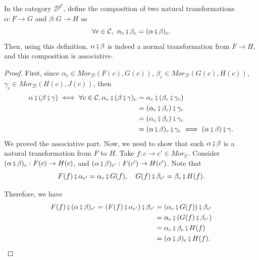 \begin{proposition}
  In the category $\mathcal D^{\mathcal C}$, define the composition of two natural
  transformations $\alpha:F\to G$ and $\beta:G\to H$ as
  \begin{displaymath}
    \forall c \in \mathcal C, \ \alpha_c \fatsemi \beta_c = (\alpha \fatsemi \beta)_c.
  \end{displaymath}
  Then, using this definition, $\alpha \fatsemi \beta$ is indeed a normal transformation
  from $F \to H$, and this composition is associative.
\end{proposition}
\begin{proof}
  First, since
  $\alpha_c \in Mor_\mathcal D (F(c),G(c))$,
  $\beta_c \in Mor_\mathcal D (G(c),H(c))$,
  $\gamma_c \in Mor_\mathcal D (H(c),J(c))$,
  then
  \begin{align*}
    \alpha \fatsemi (\beta \fatsemi \gamma) \iff 
    \forall c \in \mathcal C, \alpha_c \fatsemi (\beta \fatsemi \gamma)_c &=
    \alpha_c \fatsemi (\beta_c \fatsemi \gamma_c)\\&=
    (\alpha_c \fatsemi \beta_c) \fatsemi \gamma_c \\&= 
    (\alpha_c \fatsemi \beta_c) \fatsemi \gamma_c \\&= 
    (\alpha \fatsemi \beta)_c \fatsemi \gamma_c
    \iff (\alpha \fatsemi \beta) \fatsemi \gamma.
  \end{align*}
  We proved the associative part. Now, we need to show that such $\alpha \fatsemi \beta$
  is a natural transformation from $F$ to $H$. Take $f:c\to c' \in Mor_\mathcal C$.
  Consider $(\alpha \fatsemi \beta)_{c}:F(c) \to H(c)$, and
  $(\alpha\fatsemi \beta)_{c'}:F(c') \to H(c')$. Note that
  \begin{displaymath}
    F(f) \fatsemi \alpha_{c'} = \alpha_{c} \fatsemi G(f), \quad
    G(f) \fatsemi \beta_{c'} = \beta_{c} \fatsemi H(f).
  \end{displaymath}

  Therefore, we have
  \begin{align*}
    F(f) \fatsemi (\alpha\fatsemi \beta)_{c'} =
    (F(f) \fatsemi \alpha_{c'}) \fatsemi \beta_{c'} &=
    (\alpha_c \fatsemi G(f)) \fatsemi \beta_{c'} \\&=
    \alpha_c \fatsemi (G(f) \fatsemi \beta_{c'}) \\&=
    \alpha_c \fatsemi \beta_c \fatsemi H(f)\\&=
    (\alpha \fatsemi \beta)_c \fatsemi H(f).
  \end{align*}
\end{proof}

